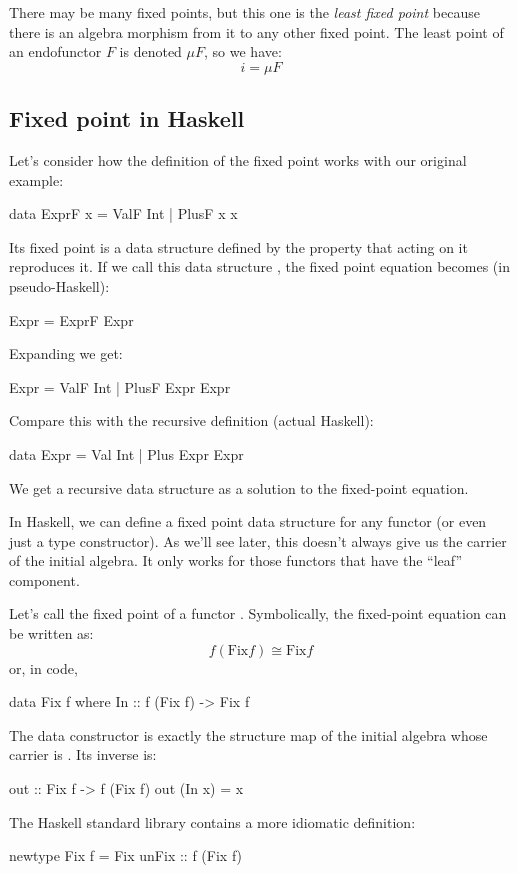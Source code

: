\documentclass[DaoFP]{subfiles}
\begin{document}
There may be many fixed points, but this one is the \emph{least fixed point} because there is an algebra morphism from it to any other fixed point. The least point of an endofunctor $F$ is denoted $\mu F$, so we have:
\[ i = \mu F \]
\subsection{Fixed point in Haskell}
Let's consider how the definition of the fixed point works with our original example:
\begin{haskell}
data ExprF x = ValF Int | PlusF x x
\end{haskell}
Its fixed point is a data structure defined by the property that  acting on it reproduces it. If we call this data structure , the fixed point equation becomes  (in pseudo-Haskell):
\begin{haskell}
Expr = ExprF Expr
\end{haskell}
Expanding  we get:
\begin{haskell}
Expr = ValF Int | PlusF Expr Expr
\end{haskell}
Compare this with the recursive definition (actual Haskell):
\begin{haskell}
data Expr = Val Int | Plus Expr Expr
\end{haskell}
We get a recursive data structure as a solution to the fixed-point equation.

In Haskell, we can define a fixed point data structure for any functor (or even just a type constructor). As we'll see later, this doesn't always give us the carrier of the initial algebra. It only works for those functors that have the ``leaf'' component.

Let's call  the fixed point of a functor . Symbolically, the fixed-point equation can be written as:
\[f ( \text{Fix} f) \cong  \text{Fix} f \]
or, in code,
\begin{haskell}
data Fix f where
  In :: f (Fix f) -> Fix f
\end{haskell}
The data constructor  is exactly the structure map of the initial algebra whose carrier is . Its inverse is:
\begin{haskell}
out :: Fix f -> f (Fix f)
out (In x) = x
\end{haskell}
The Haskell standard library contains a more idiomatic definition:
\begin{haskell}
newtype Fix f = Fix { unFix :: f (Fix f) }
\end{haskell}
\end{document}
